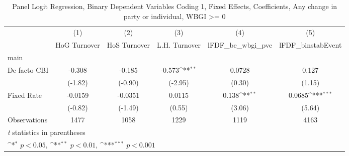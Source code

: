 \begin{table}[htbp]\centering
\def\sym#1{\ifmmode^{#1}\else\(^{#1}\)\fi}
\caption{Panel Logit Regression, Binary Dependent Variables Coding 1, Fixed Effects, Coefficients, Any change in party or individual, WBGI >= 0 \label{logitFEMultIndDF}}
\begin{tabular}{l*{5}{c}}
\toprule
                                        &\multicolumn{1}{c}{(1)}&\multicolumn{1}{c}{(2)}&\multicolumn{1}{c}{(3)}&\multicolumn{1}{c}{(4)}&\multicolumn{1}{c}{(5)}\\
                                        &\multicolumn{1}{c}{HoG Turnover}&\multicolumn{1}{c}{HoS Turnover}&\multicolumn{1}{c}{L.H. Turnover}&\multicolumn{1}{c}{lFDF\_be\_wbgi\_pve}&\multicolumn{1}{c}{lFDF\_binstabEvent}\\
\midrule
main                                    &                  &                  &                  &                  &                  \\
De facto CBI                            &   -0.308         &   -0.185         &   -0.573\sym{**} &   0.0728         &    0.127         \\
                                        &  (-1.82)         &  (-0.90)         &  (-2.95)         &   (0.30)         &   (1.15)         \\
\addlinespace
Fixed Rate                              &  -0.0159         &  -0.0351         &   0.0115         &    0.138\sym{**} &   0.0685\sym{***}\\
                                        &  (-0.82)         &  (-1.49)         &   (0.55)         &   (3.06)         &   (5.64)         \\
\midrule
Observations                            &     1477         &     1058         &     1229         &     1119         &     4163         \\
\bottomrule
\multicolumn{6}{l}{\footnotesize \textit{t} statistics in parentheses}\\
\multicolumn{6}{l}{\footnotesize \sym{*} \(p<0.05\), \sym{**} \(p<0.01\), \sym{***} \(p<0.001\)}\\
\end{tabular}
\end{table}
